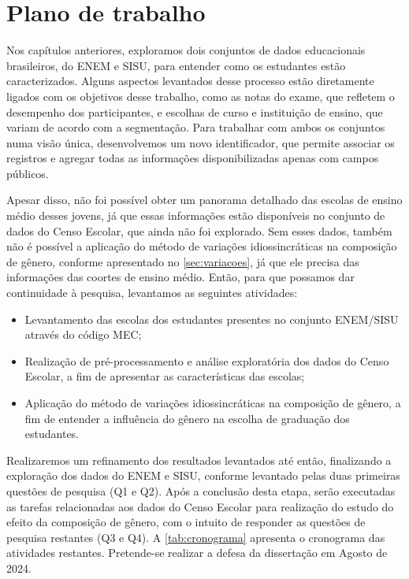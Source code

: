 \chapter{Plano de trabalho}
\label{cap:plano-trabalho}

Nos capítulos anteriores, exploramos dois conjuntos de dados educacionais brasileiros, do ENEM e SISU, para entender como os estudantes estão caracterizados. Alguns aspectos levantados desse processo estão diretamente ligados com os objetivos desse trabalho, como as notas do exame, que refletem o desempenho dos participantes, e escolhas de curso e instituição de ensino, que variam de acordo com a segmentação. Para trabalhar com ambos os conjuntos numa visão única, desenvolvemos um novo identificador, que permite associar os registros e agregar todas as informações disponibilizadas apenas com campos públicos. 

Apesar disso, não foi possível obter um panorama detalhado das escolas de ensino médio desses jovens, já que essas informações estão disponíveis no conjunto de dados do Censo Escolar, que ainda não foi explorado. Sem esses dados, também não é possível a aplicação do método de variações idiossincráticas na composição de gênero, conforme apresentado no \autoref{sec:variacoes}, já que ele precisa das informações das coortes de ensino médio. Então, para que possamos dar continuidade à pesquisa, levantamos as seguintes atividades:

\begin{itemize}
    \item Levantamento das escolas dos estudantes presentes no conjunto ENEM/SISU através do código MEC;
    \item Realização de pré-processamento e análise exploratória dos dados do Censo Escolar, a fim de apresentar as características das escolas;
    \item Aplicação do método de variações idiossincráticas na composição de gênero, a fim de entender a influência do gênero na escolha de graduação dos estudantes.
\end{itemize}

  Realizaremos um refinamento dos resultados levantados até então, finalizando a exploração dos dados do ENEM e SISU, conforme levantado pelas duas primeiras questões de pesquisa (Q1 e Q2). Após a conclusão desta etapa, serão executadas as tarefas relacionadas aos dados do Censo Escolar para realização do estudo do efeito da composição de gênero, com o intuito de responder as questões de pesquisa restantes (Q3 e Q4). A \autoref{tab:cronograma} apresenta o cronograma das atividades restantes. Pretende-se realizar a defesa da dissertação em Agosto de 2024.

